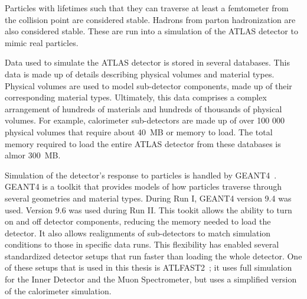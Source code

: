 %
%
%
\par Particles with lifetimes such that they can traverse at least a femtometer from the collision 
point are considered stable. Hadrons from parton hadronization are also considered stable. 
These are run into a simulation of the ATLAS detector to mimic real particles. 

\par Data used to simulate the ATLAS detector is stored in several databases.
This data is made up of details describing physical volumes and material types. 
Physical volumes are used to model sub-detector components, made up of their 
corresponding material types. Ultimately, this 
data comprises a complex arrangement of hundreds of materials and hundreds of thousands of 
physical volumes. For example, calorimeter sub-detectors are made up of over 100 000 physical 
volumes that require about 40~MB or memory to load. The total memory required to load 
the entire ATLAS detector from these databases is almor 300~MB.  

\par Simulation of the detector's response to particles is handled by GEANT4~\cite{geant4}. GEANT4 
is a toolkit that provides models of how particles traverse through several geometries 
and material types. During Run I, GEANT4 version 9.4 was used. Version 9.6 was used 
during Run II. This tookit allows the ability to turn on and off detector components, 
reducing the memory needed to load the detector. It also allows realignments of sub-detectors 
to match simulation conditions to those in specific data runs. This flexibility has enabled several 
standardized detector setups that run faster than loading the whole detector. One of these 
setups that is used in this thesis is ATLFAST2~\cite{PUB-2010-013}; it uses full simulation for the 
Inner Detector and the Muon Spectrometer, but uses a simplified version of the calorimeter 
simulation. 

